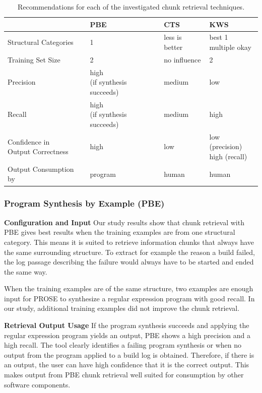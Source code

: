 \begin{table}[tbp]
\centering
\begin{tabularx}{\columnwidth}{@{}llll@{}}
  \toprule
  & PBE & CTS & KWS \\
  \midrule
  Structural Categories & 1 & less is better & \makecell[l]{best 1 \\ multiple okay} \\
  Training Set Size & 2 & no influence & 2 \\ 
  Precision & \makecell[l]{high \\ (if synthesis succeeds)} & medium & low \\ 
  Recall & \makecell[l]{high \\ (if synthesis succeeds)} & medium & high \\ 
  \makecell[l]{Confidence in \\ Output Correctness} & high & low & \makecell[l]{low (precision) \\ high (recall)} \\ 
  Output Consumption by & program & human & human \\ 
  \bottomrule
\end{tabularx}
\caption{Recommendations for each of the investigated chunk retrieval techniques.}
\label{tab:single-technique-recommendations}
\end{table}

\subsubsection{Program Synthesis by Example (PBE)}

\noindent
\textbf{Configuration and Input}
Our study results show that chunk retrieval with PBE gives best results when the training examples are from one structural category.
This means it is suited to retrieve information chunks that always have the same surrounding structure.
To extract for example the reason a build failed, the log passage describing the failure would always have to be started and ended the same way.

When the training examples are of the same structure, two examples are enough input for PROSE to synthesize a regular expression program with good recall.
In our study, additional training examples did not improve the chunk retrieval.

\noindent
\textbf{Retrieval Output Usage}
If the program synthesis succeeds and applying the regular expression program yields an output, PBE shows a high precision and a high recall.
The tool clearly identifies a failing program synthesis or when no output from the program applied to a build log is obtained.
Therefore, if there is an output, the user can have high confidence that it is the correct output.
This makes output from PBE chunk retrieval well suited for consumption by other software components.

